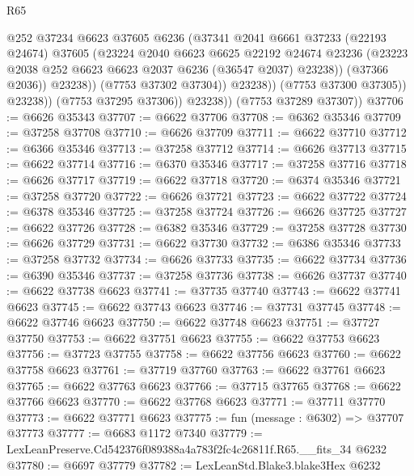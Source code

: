 \begin{lexlean}{R65}
\begin{coremodule}
{                            @252
                            @37234
                            @6623
                            @37605
                            @6236
                            (@37341
                              @2041
                              @6661
                              @37233
                              (@22193 @24674)
                              @37605
                              (@23224
                                @2040
                                @6623
                                @6625
                                @22192
                                @24674
                                @23236
                                (@23223 @2038 @252 @6623 @6623 @2037 @6236 (@36547 @2037) @23238))
                              (@37366 @2036))
                            @23238))
                        (@7753 @37302 @37304))
                      @23238))
                  (@7753 @37300 @37305))
                @23238))
            (@7753 @37295 @37306))
          @23238))
      (@7753 @37289 @37307))
@37706 := @6626 @35343
@37707 := @6622 @37706
@37708 := @6362 @35346
@37709 := @37258 @37708
@37710 := @6626 @37709
@37711 := @6622 @37710
@37712 := @6366 @35346
@37713 := @37258 @37712
@37714 := @6626 @37713
@37715 := @6622 @37714
@37716 := @6370 @35346
@37717 := @37258 @37716
@37718 := @6626 @37717
@37719 := @6622 @37718
@37720 := @6374 @35346
@37721 := @37258 @37720
@37722 := @6626 @37721
@37723 := @6622 @37722
@37724 := @6378 @35346
@37725 := @37258 @37724
@37726 := @6626 @37725
@37727 := @6622 @37726
@37728 := @6382 @35346
@37729 := @37258 @37728
@37730 := @6626 @37729
@37731 := @6622 @37730
@37732 := @6386 @35346
@37733 := @37258 @37732
@37734 := @6626 @37733
@37735 := @6622 @37734
@37736 := @6390 @35346
@37737 := @37258 @37736
@37738 := @6626 @37737
@37740 := @6622 @37738 @6623
@37741 := @37735 @37740
@37743 := @6622 @37741 @6623
@37745 := @6622 @37743 @6623
@37746 := @37731 @37745
@37748 := @6622 @37746 @6623
@37750 := @6622 @37748 @6623
@37751 := @37727 @37750
@37753 := @6622 @37751 @6623
@37755 := @6622 @37753 @6623
@37756 := @37723 @37755
@37758 := @6622 @37756 @6623
@37760 := @6622 @37758 @6623
@37761 := @37719 @37760
@37763 := @6622 @37761 @6623
@37765 := @6622 @37763 @6623
@37766 := @37715 @37765
@37768 := @6622 @37766 @6623
@37770 := @6622 @37768 @6623
@37771 := @37711 @37770
@37773 := @6622 @37771 @6623
@37775 := fun (message : @6302) => @37707 @37773
@37777 := @6683 @1172 @7340
@37779 := LexLeanPreserve.Cd542376f089388a4a783f2fc4c26811f.R65.__fits_34 @6232
@37780 := @6697 @37779
@37782 := LexLeanStd.Blake3.blake3Hex @6232
}
\end{coremodule}
\end{lexlean}
